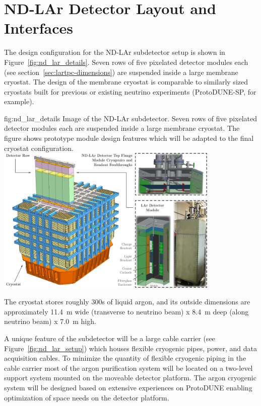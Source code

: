 \section{ND-LAr Detector Layout and Interfaces}
\label{sec:int-inst-ndlar-layout}

The design configuration for the ND-LAr subdetector setup is shown in Figure~\ref{fig:nd_lar_details}. Seven rows of five pixelated detector modules each (see section~\ref{sec:lartpc-dimensions}) are suspended inside a large membrane cryostat. The design of the membrane cryostat is comparable to similarly sized cryostats built for previous or existing neutrino experiments (ProtoDUNE-SP, for example).

\begin{dunefigure}{fig:nd_lar_details}
{Image of the ND-LAr subdetector. Seven rows of five pixelated detector modules each are suspended inside a large membrane cryostat. The figure shows prototype module design features which will be adapted to the final cryostat configuration.}
\includegraphics[width=0.8\textwidth]{graphics/i-and-i/nd_lar_details}
\end{dunefigure}

The cryostat stores roughly \SI{300}{\metricton}s of liquid argon, and its outside dimensions are approximately \SI{11.4}{\m} wide (transverse to neutrino beam) x \SI{8.4}{\m} deep (along neutrino beam) x \SI{7.0}{\m} high.  A unique feature of the subdetector will be a large cable carrier (see Figure~\ref{fig:nd_lar_setup}) which houses flexible cryogenic pipes, power, and data acquisition cables. To minimize the quantity of flexible cryogenic piping in the cable carrier most of the argon purification system will be located on a two-level support system mounted on the moveable detector platform. The argon cryogenic system will be designed based on extensive experiences on ProtoDUNE enabling optimization of space needs on the detector platform.

